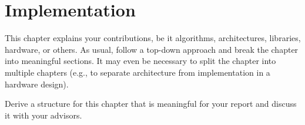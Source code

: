 \chapter{Implementation}
\label{ch:implementation}

This chapter explains your contributions, be it algorithms, architectures, libraries, hardware, or others.
As usual, follow a top-down approach and break the chapter into meaningful sections.
It may even be necessary to split the chapter into multiple chapters (e.g., to separate architecture from implementation in a hardware design).

Derive a structure for this chapter that is meaningful for your report and discuss it with your advisors.
